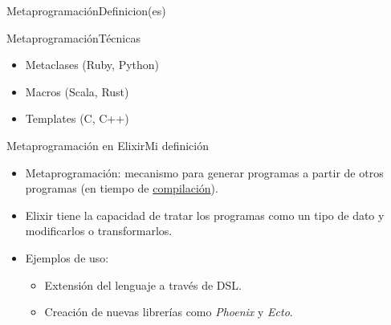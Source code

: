 \documentclass[14pt,aspectratio=169]{beamer}
\begin{document}
\begin{frame}{Metaprogramación}{Definicion(es)}
\end{frame}

\begin{frame}{Metaprogramación}{Técnicas}
  \begin{itemize}
    \item Metaclases (Ruby, Python)
    \item Macros (Scala, Rust)
    \item Templates (C, C++)
  \end{itemize}
\end{frame}

\begin{frame}{Metaprogramación en Elixir}{Mi definición}
  \begin{itemize}
    \item Metaprogramación: mecanismo para generar programas a partir de
    otros programas (en tiempo de \underline{compilación}).
    \item Elixir tiene la capacidad de tratar los programas como un tipo de dato
    y modificarlos o transformarlos.
    \item Ejemplos de uso:
      \begin{itemize}
        \item Extensión del lenguaje a través de DSL.
        \item Creación de nuevas librerías como \textit{Phoenix} y \textit{Ecto}.
      \end{itemize}
  \end{itemize}
\end{frame}
\end{document}
